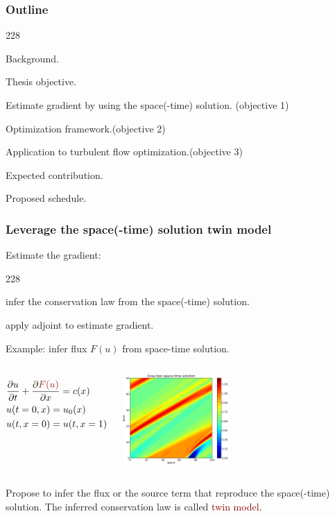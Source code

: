 \documentclass{beamer}
\newcommand{\barrow}{\item[\color{darkred}\ding{228}]}
\begin{document}
\begin{frame}
    \frametitle{Outline}\small
    \begin{dinglist}{228}
        \barrow {} Background.
        \barrow Thesis objective.
        \vspace{.35cm}
        \barrow Estimate gradient by using the space(-time) solution. \hfill        (objective 1)
        \barrow {}
                Optimization framework.\hfill(objective 2)
        \barrow Application to turbulent flow optimization.\hfill(objective 3)\\
        \vspace{.35cm}
        \barrow Expected contribution.
        \barrow Proposed schedule.
    \end{dinglist}
\end{frame}



\begin{frame}
    \frametitle{Leverage the space(-time) solution \hfill \scriptsize{twin model}}\small
    Estimate the gradient:
    \begin{dinglist}{228}
        \barrow infer the conservation law from the space(-time) solution.
        \barrow apply adjoint to estimate gradient.
    \end{dinglist}
    \vspace{.2cm}

    Example: infer flux $F(u)$ from space-time solution.
    \begin{columns}
        \begin{equation*}\begin{split}
            &\frac{\partial u}{\partial t}+ \frac{\partial \textcolor{darkred}{F(u)}}{\partial x} = c(x)\\
            &u(t=0,x) = u_0(x)\\
            &u(t,x=0) = u(t, x=1)
        \end{split}\end{equation*}
        \begin{center}
            \includegraphics[width=4cm]{imag_1.png}
        \end{center}
    \end{columns}
    \vspace{.15cm}
    Propose to infer the flux or the source term that reproduce the space(-time) solution. The inferred
    conservation law is called \textcolor{darkred}{twin model}.
\end{frame}
\end{document}

